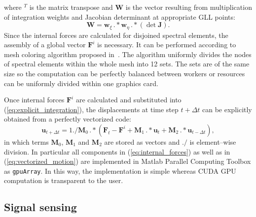 \documentclass[12pt]{iopart}
\renewcommand{\vec}[1]{\mathbf{#1}}
\begin{document}
where $^T$ is the matrix transpose and $\vec{W}$ is the vector resulting from multiplication of integration weights and Jacobian determinant at appropriate GLL points:
\begin{equation}
\vec{W} = \vec{w}_{\xi}\,.*\vec{w}_{\eta}\,.*\left(\det\vec{J}\right).
\end{equation}
Since the internal forces are calculated for disjoined spectral elements, the assembly of a global vector $\vec{F}^i$ is necessary. It can be performed according to mesh coloring algorithm proposed in~\cite{Kudela2016}. The algorithm uniformly divides the nodes of spectral elements within the whole mesh into 12 sets. The sets are of the same size so the computation can be perfectly balanced between workers or resources can be uniformly divided within one graphics card.

Once internal forces $\vec{F}^i$ are calculated and substituted into (\ref{eq:explicit_integration}), the displacements at time step $t+\Delta t$ can be explicitly obtained from a perfectly vectorized code:
\begin{equation}
\vec{u}_{t+\Delta t}=1./\vec{M}_0\, .*\left(\vec{F}_t - \vec{F}^i +\vec{M}_1 \, .* \vec{u}_t +\vec{M}_2 \, .* \vec{u}_{t-\Delta t}\right),
\label{eq:vectorized_motion}
\end{equation} 
in which terms $\vec{M}_0$, $\vec{M}_1$ and $\vec{M}_2$ are stored as vectors and $./$ is element--wise division. In particular all components in (\ref{eq:internal_forces}) as well as in (\ref{eq:vectorized_motion}) are implemented in Matlab Parallel Computing Toolbox as \verb|gpuArray|. In this way, the implementation is simple whereas CUDA GPU computation is transparent to the user. 

\subsection{Signal sensing}
\end{document}
